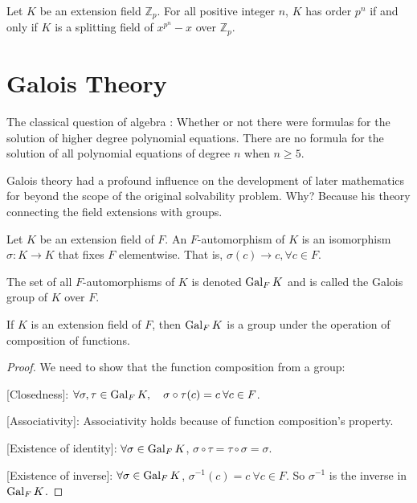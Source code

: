 \begin{theorem}
    Let $K$ be an extension field $\mathbb{Z}_p$. For all positive integer $n$, 
    $K$ has order $p^n$ if and only if $K$ is a splitting field of $x^{p^n} - x$ over $\mathbb{Z}_p$.
\end{theorem}

\section{Galois Theory}

The classical question of algebra : Whether or not there were formulas for the solution of higher degree polynomial 
equations. There are no formula for the solution of all polynomial equations of degree $n$ when $n \geq 5$.

Galois theory had a profound influence on the development of later mathematics for beyond the scope of 
the original solvability problem. Why? Because his theory connecting the field extensions with groups.

\begin{definition}
    Let $K$ be an extension field of $F$. An $F$-automorphism of $K$ is an isomorphism $\sigma : K \to K$ that 
    fixes $F$ elementwise. That is, $\sigma(c) \to c, \forall c \in F$.

    The set of all $F$-automorphisms of $K$ is denoted $\operatorname{Gal}_F K$ and is called the Galois group of $K$ over $F$.
\end{definition}

\begin{theorem}
    If $K$ is an extension field of $F$, then $\operatorname{Gal}_F K$ is a group under the operation 
    of composition of functions.
\end{theorem}
\begin{proof}
    We need to show that the function composition from a group:

    [Closedness]: $\forall \sigma, \tau \in \operatorname{Gal}_F K, \quad \sigma \circ \tau (c) = c \> \forall c \in F$.
    
    [Associativity]: Associativity holds because of function composition's property.
    
    [Existence of identity]: $\forall \sigma \in \operatorname{Gal}_F K$, $\sigma \circ \tau = \tau \circ \sigma = \sigma$.

    [Existence of inverse]: $\forall \sigma \in \operatorname{Gal}_F K$, $\sigma^{-1}(c) = c \> \forall c \in F$. So 
    $\sigma^{-1}$ is the inverse in $\operatorname{Gal}_F K$.
\end{proof}

